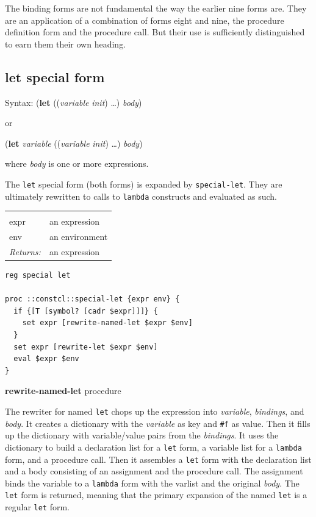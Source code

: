 \documentclass[twoside]{report}
\begin{document}
The binding forms are not fundamental the way the earlier nine forms are. They are an application of a combination of forms eight and nine, the procedure definition form and the procedure call. But their use is sufficiently distinguished to earn them their own heading.

\subsection{let special form}
\label{let-special-form}

Syntax: (\textbf{let} ((\emph{variable} \emph{init}) \ldots ) \emph{body})

or

(\textbf{let} \emph{variable} ((\emph{variable} \emph{init}) \ldots ) \emph{body})

where \emph{body} is one or more expressions.

The \texttt{let} special form (both forms) is expanded by \texttt{special-let}. They are ultimately rewritten to calls to \texttt{lambda} constructs and evaluated as such.

\noindent\begin{tabular}{ |p{1.9cm} p{8cm}| }
\hline
\rowcolor[HTML]{CCCCCC} \multicolumn{2}{|l|}{\bf special-let (internal)} \\
expr & an expression \\
env & an environment \\
\textit{Returns:} & an expression \\
\hline
\end{tabular}

\begin{lstlisting}
reg special let

proc ::constcl::special-let {expr env} {
  if {[T [symbol? [cadr $expr]]]} {
    set expr [rewrite-named-let $expr $env]
  }
  set expr [rewrite-let $expr $env]
  eval $expr $env
}
\end{lstlisting}

\textbf{rewrite-named-let} procedure

The rewriter for named \texttt{let} chops up the expression into \emph{variable}, \emph{bindings}, and \emph{body}. It creates a dictionary with the \emph{variable} as key and \texttt{\#f} as value. Then it fills up the dictionary with variable/value pairs from the \emph{bindings}. It uses the dictionary to build a declaration list for a \texttt{let} form, a variable list for a \texttt{lambda} form, and a procedure call. Then it assembles a \texttt{let} form with the declaration list and a body consisting of an assignment and the procedure call. The assignment binds the variable to a \texttt{lambda} form with the varlist and the original \emph{body}. The \texttt{let} form is returned, meaning that the primary expansion of the named \texttt{let} is a regular \texttt{let} form.
\end{document}
